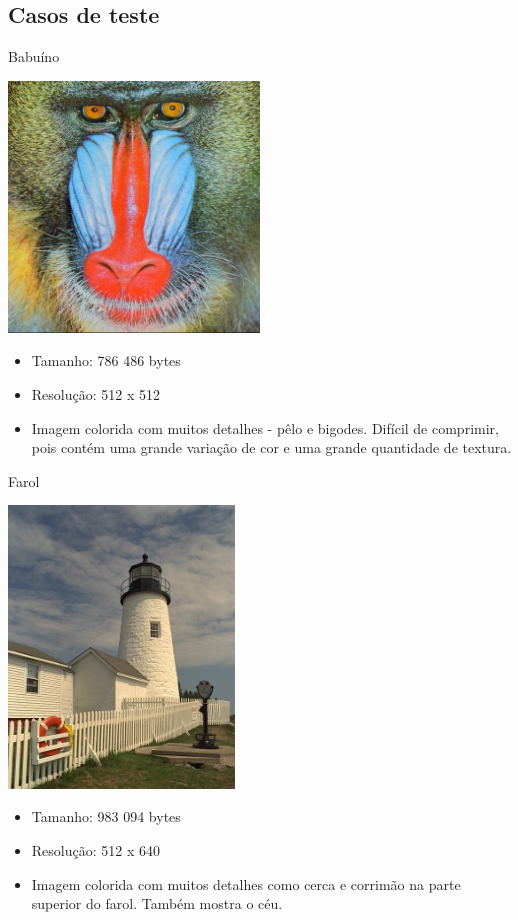 \documentclass{beamer}
\begin{document}
  \subsection{Casos de teste}
  \begin{frame}{Babuíno}
    \begin{multicols}{2}
      \includegraphics[width=0.5\textwidth]{figure/baboon100.jpg}
      \begin{itemize}
        \item Tamanho: 786 486 bytes
        \item Resolução: 512 x 512
        \item Imagem colorida com muitos detalhes - pêlo e bigodes. Difícil de comprimir, pois contém uma grande variação de cor e uma grande quantidade de textura.
      \end{itemize}
    \end{multicols}
  \end{frame}
  \begin{frame}{Farol}
    \begin{multicols}{2}
      \includegraphics[width=0.45\textwidth]{figure/lighthouse100.jpg}
      \begin{itemize}
        \item Tamanho: 983 094 bytes
        \item Resolução: 512 x 640
        \item Imagem colorida com muitos detalhes como cerca e corrimão na parte superior do farol. Também mostra o céu.
      \end{itemize}
    \end{multicols}
  \end{frame}
\end{document}
